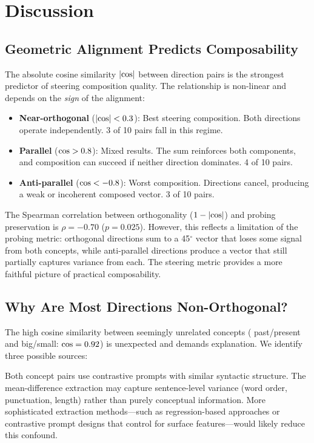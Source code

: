 \section{Discussion}
\label{sec:discussion}

\subsection{Geometric Alignment Predicts Composability}

The absolute cosine similarity $|\text{cos}|$ between direction pairs is the
strongest predictor of steering composition quality. The relationship is
non-linear and depends on the \emph{sign} of the alignment:

\begin{itemize}[leftmargin=*,itemsep=2pt,topsep=2pt]
    \item \textbf{Near-orthogonal} ($|\text{cos}| < 0.3$): Best steering
    composition. Both directions operate independently. 3 of 10 pairs fall
    in this regime.
    \item \textbf{Parallel} ($\text{cos} > 0.8$): Mixed results. The sum
    reinforces both components, and composition can succeed if neither
    direction dominates. 4 of 10 pairs.
    \item \textbf{Anti-parallel} ($\text{cos} < -0.8$): Worst composition.
    Directions cancel, producing a weak or incoherent composed vector. 3
    of 10 pairs.
\end{itemize}

The Spearman correlation between orthogonality ($1 - |\text{cos}|$) and probing
preservation is $\rho = -0.70$ ($p = 0.025$). However, this reflects a
limitation of the probing metric: orthogonal directions sum to a 45$^\circ$
vector that loses some signal from both concepts, while anti-parallel directions
produce a vector that still partially captures variance from each. The steering
metric provides a more faithful picture of practical composability.

\subsection{Why Are Most Directions Non-Orthogonal?}

The high cosine similarity between seemingly unrelated concepts (\eg
past/present and big/small: $\text{cos} = 0.92$) is unexpected and demands
explanation. We identify three possible sources:

Both concept pairs use contrastive prompts with similar syntactic structure. The
mean-difference extraction may capture sentence-level variance (word order,
punctuation, length) rather than purely conceptual information. More
sophisticated extraction methods---such as regression-based approaches or
contrastive prompt designs that control for surface features---would likely
reduce this confound.

